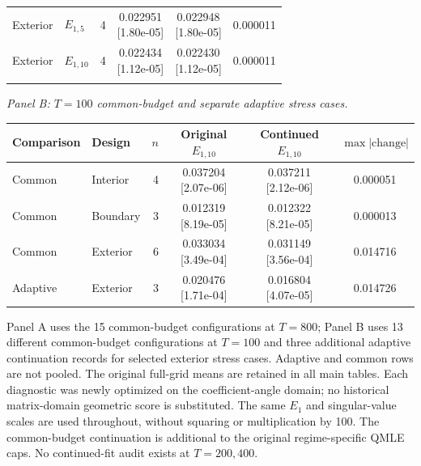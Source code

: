 \documentclass[12pt,letterpaper]{article}
\theoremstyle{plain}
\theoremstyle{definition}
\begin{document}
\begin{table}[p]
\begin{adjustbox}{max width=\linewidth}
\begin{tabular}{llrccc}
Exterior & $E_{1,5}$ & 4 & \shortstack{0.022951\\[-1pt]{\scriptsize[1.80e-05]}} & \shortstack{0.022948\\[-1pt]{\scriptsize[1.80e-05]}} & 0.000011\\
Exterior & $E_{1,10}$ & 4 & \shortstack{0.022434\\[-1pt]{\scriptsize[1.12e-05]}} & \shortstack{0.022430\\[-1pt]{\scriptsize[1.12e-05]}} & 0.000011\\
\addlinespace
\bottomrule
\end{tabular}
\end{adjustbox}
\par\smallskip
\textit{Panel B: $T=100$ common-budget and separate adaptive stress cases.}\par\smallskip
\begin{adjustbox}{max width=\linewidth}
\begin{tabular}{llrccc}
\toprule
Comparison & Design & $n$ & Original $E_{1,10}$ & Continued $E_{1,10}$ & $\max|\mathrm{change}|$\\
\midrule
Common & Interior & 4 & \shortstack{0.037204\\[-1pt]{\scriptsize[2.07e-06]}} & \shortstack{0.037211\\[-1pt]{\scriptsize[2.12e-06]}} & 0.000051\\
Common & Boundary & 3 & \shortstack{0.012319\\[-1pt]{\scriptsize[8.19e-05]}} & \shortstack{0.012322\\[-1pt]{\scriptsize[8.21e-05]}} & 0.000013\\
Common & Exterior & 6 & \shortstack{0.033034\\[-1pt]{\scriptsize[3.49e-04]}} & \shortstack{0.031149\\[-1pt]{\scriptsize[3.56e-04]}} & 0.014716\\
Adaptive & Exterior & 3 & \shortstack{0.020476\\[-1pt]{\scriptsize[1.71e-04]}} & \shortstack{0.016804\\[-1pt]{\scriptsize[4.07e-05]}} & 0.014726\\
\bottomrule
\end{tabular}
\end{adjustbox}
\par\smallskip
\begin{minipage}{0.98\linewidth}\footnotesize
Panel A uses the 15 common-budget configurations at $T=800$; Panel B uses 13 different common-budget configurations at $T=100$ and three additional adaptive continuation records for selected exterior stress cases. Adaptive and common rows are not pooled. The original full-grid means are retained in all main tables. Each diagnostic was newly optimized on the coefficient-angle domain; no historical matrix-domain geometric score is substituted. The same $E_1$ and singular-value scales are used throughout, without squaring or multiplication by 100. The common-budget continuation is additional to the original regime-specific QMLE caps. No continued-fit audit exists at $T=200,400$.

\end{minipage}
\end{table}
\end{document}

